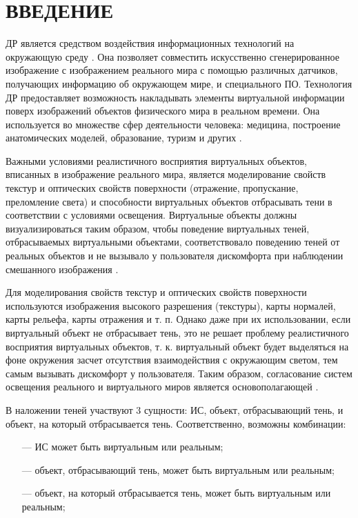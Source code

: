 \chapter*{ВВЕДЕНИЕ}

ДР является средством воздействия информационных технологий на окружающую среду \cite{osti2019real}. Она позволяет совместить искусственно сгенерированное изображение с изображением реального мира с помощью различных датчиков, получающих информацию об окружающем мире, и специального ПО. Технология ДР предоставляет возможность накладывать элементы виртуальной информации поверх изображений объектов физического мира в реальном времени. Она используется во множестве сфер деятельности человека: медицина, построение анатомических моделей, образование, туризм и других \cite{tech-ar}.

Важными условиями реалистичного восприятия виртуальных объектов, вписанных в изображение реального мира, является моделирование свойств текстур и оптических свойств поверхности (отражение, пропускание, преломление света) и способности виртуальных объектов отбрасывать тени в соответствии с условиями освещения. Виртуальные объекты должны визуализироваться таким образом, чтобы поведение виртуальных теней, отбрасываемых виртуальными объектами, соответствовало поведению теней от реальных объектов и не вызывало у пользователя дискомфорта при наблюдении смешанного изображения \cite{bogdanov}. 

Для моделирования свойств текстур и оптических свойств поверхности используются изображения высокого разрешения (текстуры), карты нормалей, карты рельефа, карты отражения и т. п. Однако даже при их использовании, если виртуальный объект не отбрасывает тень, это не решает проблему реалистичного восприятия виртуальных объектов, т. к. виртуальный объект будет выделяться на фоне окружения засчет отсутствия взаимодействия с окружающим светом, тем самым вызывать дискомфорт у пользователя. Таким образом, согласование систем освещения реального и виртуального миров является основополагающей \cite{osti2019real}.

В наложении теней участвуют 3 сущности: ИС, объект, отбрасывающий тень, и объект, на который отбрасывается тень. Соответственно, возможны комбинации:

\begin{itemize}
	\item[---] ИС может быть виртуальным или реальным;
	\item[---] объект, отбрасывающий тень, может быть виртуальным или реальным;
	\item[---] объект, на который отбрасывается тень, может быть виртуальным или реальным;
\end{itemize}

